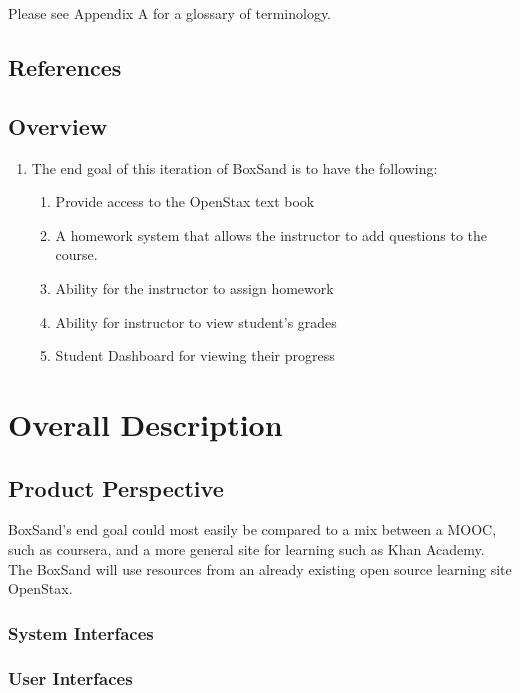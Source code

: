 \documentclass[onecolumn, draftclsnofoot,10pt, compsoc]{IEEEtran}
\begin{document}
Please see Appendix A for a glossary of terminology. 

\subsection{References}

\subsection{Overview}

\begin{enumerate}
\item The end goal of this iteration of BoxSand is to have the following:
\begin{enumerate}
\item Provide access to the OpenStax text book
\item A homework system that allows the instructor to add questions to the course.
\item Ability for the instructor to assign homework
\item Ability for instructor to view student's grades 
\item Student Dashboard for viewing their progress
\end{enumerate}
\end{enumerate}

\section{Overall Description}

\subsection{Product Perspective}
BoxSand's end goal could most easily be compared to a mix between a MOOC, such as coursera, and a more general site for learning such as Khan Academy. The BoxSand will use resources from an already existing open source learning site OpenStax.

\subsubsection{System Interfaces}

\subsubsection{User Interfaces}
\end{document}
